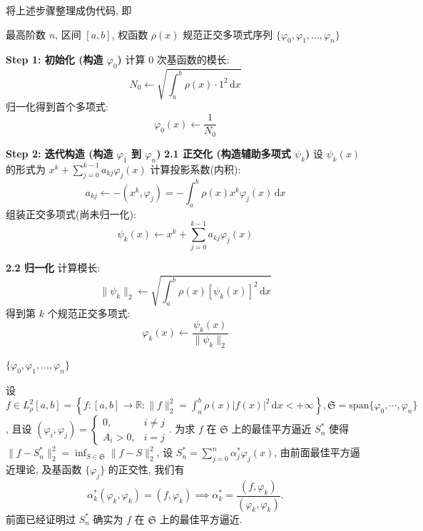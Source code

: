 \documentclass[UTF8, a4paper, 11pt]{ctexart}
\begin{document}
将上述步骤整理成伪代码, 即
\begin{algorithm}[H]
\caption{Gram-Schmidt 正交化构造规范正交多项式}
\label{alg:gram_schmidt_poly}
\begin{algorithmic}[1]
\REQUIRE 最高阶数 $n$, 区间 $[a, b]$, 权函数 $\rho(x)$
\ENSURE 规范正交多项式序列 $\{\varphi_0, \varphi_1, \dots, \varphi_n\}$

\STATE \textbf{Step 1: 初始化 (构造 $\varphi_0$)}
\STATE 计算 $0$ 次基函数的模长: 
\[ N_0 \leftarrow \sqrt{\int_a^b \rho(x) \cdot 1^2 \, \mathrm{d}x} \]
\STATE 归一化得到首个多项式: 
\[ \varphi_0(x) \leftarrow \frac{1}{N_0} \]

\STATE \textbf{Step 2: 迭代构造 (构造 $\varphi_1$ 到 $\varphi_n$)}
    \STATE \textbf{2.1 正交化 (构造辅助多项式 $\psi_k$)}
    \STATE 设 $\psi_k(x)$ 的形式为 $x^k + \sum_{j=0}^{k-1} a_{kj} \varphi_j(x)$
        \STATE 计算投影系数(内积): 
        \[ a_{kj} \leftarrow - (x^k, \varphi_j) = - \int_a^b \rho(x) x^k \varphi_j(x) \, \mathrm{d}x \]
    \ENDFOR
    \STATE 组装正交多项式(尚未归一化): 
    \[ \psi_k(x) \leftarrow x^k + \sum_{j=0}^{k-1} a_{kj} \varphi_j(x) \]

    \STATE \textbf{2.2 归一化}
    \STATE 计算模长: 
    \[ \|\psi_k\|_2 \leftarrow \sqrt{\int_a^b \rho(x) [\psi_k(x)]^2 \, \mathrm{d}x} \]
    \STATE 得到第 $k$ 个规范正交多项式: 
    \[ \varphi_k(x) \leftarrow \frac{\psi_k(x)}{\|\psi_k\|_2} \]
\ENDFOR

\RETURN $\{\varphi_0, \varphi_1, \dots, \varphi_n\}$
\end{algorithmic}
\end{algorithm}
设 $ f \in L_{\rho}^2[a, b] = \left\{ f : [a, b] \rightarrow \mathbb{R} \colon \| f \|_2^2 = \int_a^b \rho(x) |f(x)|^2 \, \mathrm{d} x < +\infty \right\},\mathfrak{S} = \text{span}\{\varphi_0, \cdots, \varphi_n\} $, 且设 $ (\varphi_i, \varphi_j) = \left\{
\begin{array}{ll}
0, & i \neq j \\
A_i > 0, & i = j
\end{array}
\right. $.
为求 $ f $ 在 $ \mathfrak{S} $ 上的最佳平方逼近 $ S_n^* $ 使得 $ \| f - S_n^* \|_2^2 = \inf_{S \in \mathfrak{S}} \| f - S \|_2^2 $, 设 $ S_n^* = \sum_{j=0}^n \alpha_j^* \varphi_j(x) $, 由前面最佳平方逼近理论, 及基函数 $ \{\varphi_j\} $ 的正交性, 我们有
\begin{equation}
    \alpha_k^* (\varphi_k, \varphi_k) = (f, \varphi_k) \implies \alpha_k^* = \frac{(f, \varphi_k)}{(\varphi_k, \varphi_k)}.
\end{equation}
前面已经证明过 $ S_n^* $ 确实为 $ f $ 在 $ \mathfrak{S} $ 上的最佳平方逼近.
\end{document}
